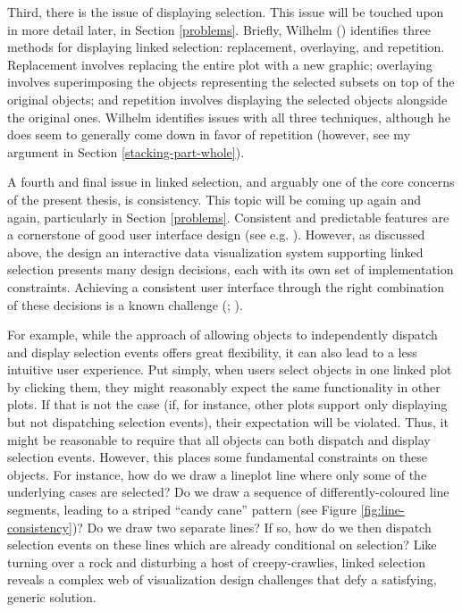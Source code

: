 \documentclass[
]{book}
\theoremstyle{definition}
\theoremstyle{definition}
\theoremstyle{definition}
\theoremstyle{definition}
\theoremstyle{remark}
\begin{document}
Third, there is the issue of displaying selection. This issue will be touched upon in more detail later, in Section \ref{problems}. Briefly, Wilhelm () identifies three methods for displaying linked selection: replacement, overlaying, and repetition. Replacement involves replacing the entire plot with a new graphic; overlaying involves superimposing the objects representing the selected subsets on top of the original objects; and repetition involves displaying the selected objects alongside the original ones. Wilhelm identifies issues with all three techniques, although he does seem to generally come down in favor of repetition (however, see my argument in Section \ref{stacking-part-whole}).

A fourth and final issue in linked selection, and arguably one of the core concerns of the present thesis, is consistency. This topic will be coming up again and again, particularly in Section \ref{problems}. Consistent and predictable features are a cornerstone of good user interface design (see e.g. ). However, as discussed above, the design an interactive data visualization system supporting linked selection presents many design decisions, each with its own set of implementation constraints. Achieving a consistent user interface through the right combination of these decisions is a known challenge (; ).

For example, while the approach of allowing objects to independently dispatch and display selection events offers great flexibility, it can also lead to a less intuitive user experience. Put simply, when users select objects in one linked plot by clicking them, they might reasonably expect the same functionality in other plots. If that is not the case (if, for instance, other plots support only displaying but not dispatching selection events), their expectation will be violated. Thus, it might be reasonable to require that all objects can both dispatch and display selection events. However, this places some fundamental constraints on these objects. For instance, how do we draw a lineplot line where only some of the underlying cases are selected? Do we draw a sequence of differently-coloured line segments, leading to a striped ``candy cane'' pattern (see Figure \ref{fig:line-consistency})? Do we draw two separate lines? If so, how do we then dispatch selection events on these lines which are already conditional on selection? Like turning over a rock and disturbing a host of creepy-crawlies, linked selection reveals a complex web of visualization design challenges that defy a satisfying, generic solution.
\end{document}
